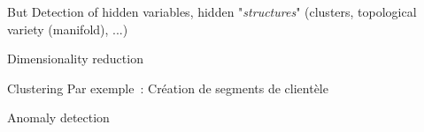 \begin{frame}{But}
  Detection of hidden variables, hidden "\textit{structures}" (clusters, topological variety (manifold), ...)

  \begin{minipage}[l]{0.69\linewidth}
  \end{minipage}\hfill
  \begin{minipage}[l]{0.29\linewidth}
  \end{minipage}\hfill
\end{frame}

\begin{frame}{Dimensionality reduction}
\end{frame}

\begin{frame}{Clustering}
  Par exemple~: Création de segments de clientèle
\end{frame}

\begin{frame}{Anomaly detection}
\end{frame}
